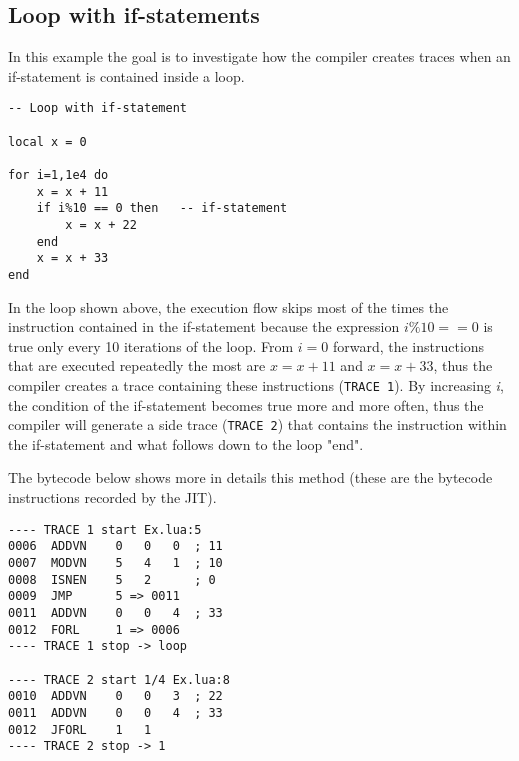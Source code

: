 \subsection{Loop with if-statements}
\label{subsec:if-statement}
In this example the goal is to investigate how the compiler creates traces when an if-statement is contained inside a loop.
\begin{mdframed}[style=LuaStyleFrame]
\begin{lstlisting}[style=LuaStyle]
-- Loop with if-statement

local x = 0

for i=1,1e4 do
	x = x + 11
	if i%10 == 0 then   -- if-statement
		x = x + 22
	end
	x = x + 33
end
\end{lstlisting}
\end{mdframed}
In the loop shown above, the execution flow skips most of the times the instruction contained in the if-statement because the expression $i\%10==0$ is true only every 10 iterations of the loop. From $i=0$ forward, the instructions that are executed repeatedly the most are $x=x+11$ and $x=x+33$, thus the compiler creates a trace containing these instructions (\texttt{TRACE 1}). By increasing \textit{i}, the condition of the if-statement becomes true more and more often, thus the compiler will generate a side trace (\texttt{TRACE 2}) that contains the instruction within the if-statement and what follows down to the loop "end".
 
 
 \begin{comment}
and when the loop becomes hot, the compiler generates a trace (TRACE 1) that contains all the instructions in the loop, but the one inside the if-statement. This happens because this set of instruction is executed repeatedly.

Later on, every time that is \textit{i} is multiple of 10, the instruction inside the if-statement is executed. This means that the same exit from the root trace (TRACE 1) is taken more and more frequently. Then, when this happens for enough times (as said before the default threshold is 56) the compiler generate a side trace (TRACE 2). It should be noted that the side trace contains both the instruction inside the if-statement $x=x+22$ and the next instruction $x=x+33$. 
 \end{comment}
The bytecode below shows more in details this method (these are the bytecode instructions recorded by the JIT). 
\begin{multicols}{2}
\begin{lstlisting}[style=DumpStyle]
---- TRACE 1 start Ex.lua:5
0006  ADDVN    0   0   0  ; 11
0007  MODVN    5   4   1  ; 10
0008  ISNEN    5   2      ; 0
0009  JMP      5 => 0011
0011  ADDVN    0   0   4  ; 33
0012  FORL     1 => 0006
---- TRACE 1 stop -> loop

---- TRACE 2 start 1/4 Ex.lua:8
0010  ADDVN    0   0   3  ; 22
0011  ADDVN    0   0   4  ; 33
0012  JFORL    1   1
---- TRACE 2 stop -> 1
\end{lstlisting}
\end{multicols}

